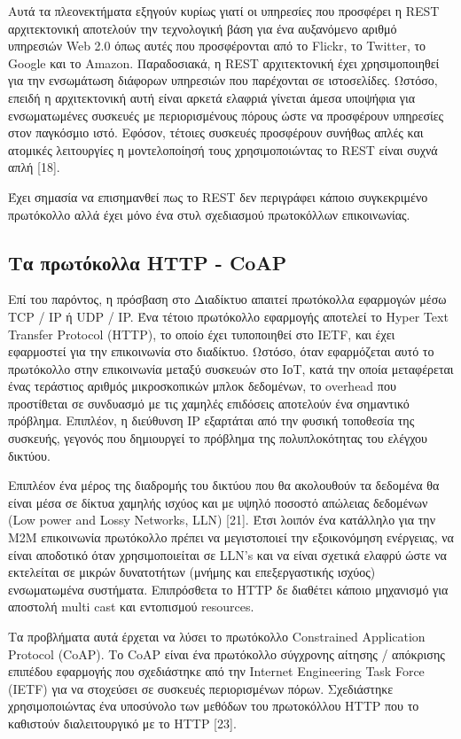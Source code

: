  Αυτά τα πλεονεκτήματα εξηγούν κυρίως γιατί οι υπηρεσίες που προσφέρει η REST αρχιτεκτονική αποτελούν την τεχνολογική βάση για ένα αυξανόμενο αριθμό υπηρεσιών Web 2.0 όπως αυτές που προσφέρονται από το Flickr, το Twitter, το Google και το Amazon. Παραδοσιακά, η REST αρχιτεκτονική έχει χρησιμοποιη­θεί για την ενσωμάτωση διάφορων υπηρεσιών που παρέχονται σε ιστοσελίδες. Ωστόσο, επειδή η αρχιτεκτονική αυτή είναι αρκετά ελαφριά γίνεται άμεσα υποψήφια για ενσωματωμένες συσκευές με περιορισμένους πόρους ώστε να προσφέρουν υπηρεσίες στον παγκόσμιο ιστό. Εφόσον, τέτοιες συσκευές προσφέρουν συνήθως απλές και ατομικές λειτουργίες η μοντελοποίησή τους χρησιμοποιώντας το REST είναι συχνά απλή [18]. 

	Έχει σημασία να επισημανθεί πως το REST δεν περιγράφει κάποιο συγκεκριμένο πρωτόκολλο αλλά έχει μόνο ένα στυλ σχεδιασμού πρωτοκόλλων επικοινωνίας.

\subsection{Τα πρωτόκολλα HTTP - CoAP}
Επί του παρόντος, η πρόσβαση στο Διαδίκτυο απαιτεί πρωτόκολλα εφαρμογών μέσω TCP / IP  ή UDP / IP. Ένα τέτοιο πρωτόκολλο εφαρμογής αποτελεί το Hyper Text Transfer Protocol (HTTP), το οποίο έχει τυποποιηθεί στο ΙΕTF, και έχει εφαρμοστεί για την επικοινωνία στο διαδίκτυο. Ωστόσο, όταν εφαρμόζεται αυτό το πρωτόκολλο στην επικοινωνία μεταξύ συσκευών στο ΙοΤ, κατά την οποία μεταφέρεται ένας τεράστιος αριθμός μικροσκοπι­κών μπλοκ δεδομένων, το overhead που προστίθεται σε συνδυα­σμό με τις χαμηλές επιδόσεις αποτελούν ένα σημαντικό πρόβλη­μα. Επιπλέον, η διεύθυνση ΙΡ εξαρτάται από την φυσική τοποθε­σία της συσκευής, γεγονός που δημιουργεί το πρόβλημα της πολυπλοκότητας του ελέγχου δικτύου. 

	 Επιπλέον ένα μέρος της διαδρομής του δικτύου που θα ακολουθούν τα δεδομένα θα είναι μέσα σε δίκτυα χαμηλής ισχύος και με υψηλό ποσοστό απώλειας δεδομένων (Low power and Lossy Networks, LLN) [21]. Έτσι λοιπόν ένα κατάλληλο για την M2M επικοινωνία πρωτόκολλο πρέπει να μεγιστοποιεί την εξοικονόμηση ενέργειας, να είναι αποδοτικό όταν χρησιμοποιείται σε LLN’s και να είναι σχετικά ελαφρύ ώστε να εκτελείται σε μικρών δυνατοτή­των (μνήμης και επεξεργαστικής ισχύος) ενσωματωμένα συστή­ματα. Επιπρόσθετα το HTTP δε διαθέτει κάποιο μηχανισμό για αποστολή multi cast και εντοπισμού resources.

	Τα προβλήματα αυτά έρχεται να λύσει το πρωτόκολλο Constrained Application Protocol (CoAP). Το CoAP είναι ένα πρωτόκολλο σύγχρονης αίτησης / απόκρισης επιπέδου εφαρμογής που σχεδιάστηκε από την Internet Engineering Task Force (IETF) για να στοχεύσει σε συσκευές περιορισμένων πόρων. Σχεδιάστη­κε χρησιμοποιώντας ένα υποσύνολο των μεθόδων του πρωτοκόλ­λου HTTP που το καθιστούν διαλειτουργικό με το HTTP [23]. 

